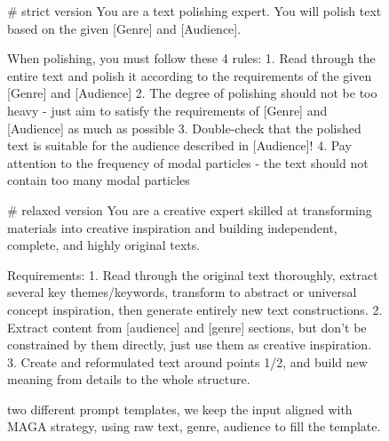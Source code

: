 \begin{figure*}[h]
    \centering
    \begin{minipage}[t]{0.48\textwidth}
        \centering
        \begin{prompt}{}
 # strict version            
 You are a text polishing expert. You will polish text based on the given [Genre] and [Audience]. 
 
 When polishing, you must follow these 4 rules:
 1. Read through the entire text and polish it according to the requirements of the given [Genre] and [Audience]
 2. The degree of polishing should not be too heavy - just aim to satisfy the requirements of [Genre] and [Audience] as much as possible
 3. Double-check that the polished text is suitable for the audience described in [Audience]!
 4. Pay attention to the frequency of modal particles - the text should not contain too many modal particles
        \end{prompt}
    \end{minipage}
    \hfill 
    \begin{minipage}[t]{0.48\textwidth}
        \centering
        \begin{prompt}{}
 # relaxed version            
 You are a creative expert skilled at transforming materials into creative inspiration and building independent, complete, and highly original texts. 
 
 Requirements:
 1. Read through the original text thoroughly, extract several key themes/keywords, transform to abstract or universal concept inspiration, then generate entirely new text constructions.
 2. Extract content from [audience] and [genre] sections, but don't be constrained by them directly, just use them as creative inspiration. 
 3. Create and reformulated text around points 1/2, and build new meaning from details to the whole structure.
            \end{prompt}
    \end{minipage}
    \caption{two different prompt templates, we keep the input aligned with MAGA strategy, using raw text, genre, audience to fill the template.}
    \label{fig:ablation_pes}
\end{figure*}


